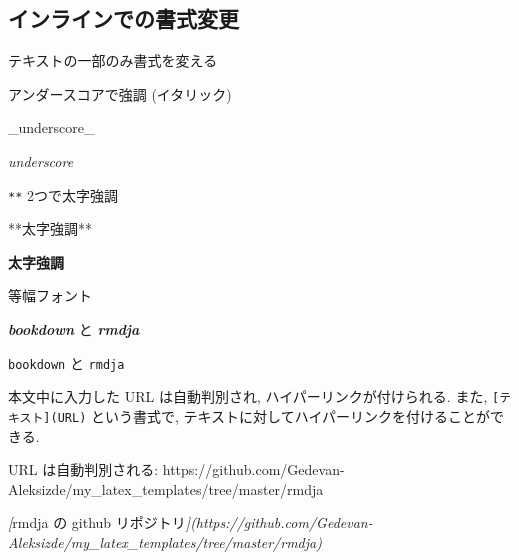 \documentclass[
]{bxjsbook}
\newenvironment{Shaded}{\begin{snugshade}}{\end{snugshade}}
\newcommand{\CommentTok}[1]{\textcolor[rgb]{0.56,0.35,0.01}{\textit{#1}}}
\newcommand{\InformationTok}[1]{\textcolor[rgb]{0.56,0.35,0.01}{\textbf{\textit{#1}}}}
\newcommand{\NormalTok}[1]{#1}
\newcommand{\OtherTok}[1]{\textcolor[rgb]{0.56,0.35,0.01}{#1}}
\theoremstyle{definition}
\theoremstyle{definition}
\theoremstyle{definition}
\theoremstyle{remark}
\begin{document}
\hypertarget{ux30a4ux30f3ux30e9ux30a4ux30f3ux3067ux306eux66f8ux5f0fux5909ux66f4}{%
\subsection{インラインでの書式変更}\label{ux30a4ux30f3ux30e9ux30a4ux30f3ux3067ux306eux66f8ux5f0fux5909ux66f4}}

テキストの一部のみ書式を変える

アンダースコアで強調 (イタリック)

\begin{Shaded}
\begin{Highlighting}[]
\NormalTok{\_underscore\_}
\end{Highlighting}
\end{Shaded}

\emph{underscore}

\texttt{**} 2つで太字強調

\begin{Shaded}
\begin{Highlighting}[]
\NormalTok{**太字強調**}
\end{Highlighting}
\end{Shaded}

\textbf{太字強調}

等幅フォント

\begin{Shaded}
\begin{Highlighting}[]
\InformationTok{\textasciigrave{}bookdown\textasciigrave{}}\NormalTok{ と }\InformationTok{\textasciigrave{}rmdja\textasciigrave{}}
\end{Highlighting}
\end{Shaded}

\texttt{bookdown} と \texttt{rmdja}

本文中に入力した URL は自動判別され, ハイパーリンクが付けられる. また,
\texttt{{[}テキスト{]}(URL)} という書式で,
テキストに対してハイパーリンクを付けることができる.

\begin{Shaded}
\begin{Highlighting}[]

\NormalTok{URL は自動判別される: https://github.com/Gedevan{-}Aleksizde/my\_latex\_templates/tree/master/rmdja}

\CommentTok{[}\OtherTok{\textasciigrave{}rmdja\textasciigrave{} の github リポジトリ}\CommentTok{](https://github.com/Gedevan{-}Aleksizde/my\_latex\_templates/tree/master/rmdja)}
\end{Highlighting}
\end{Shaded}
\end{document}
